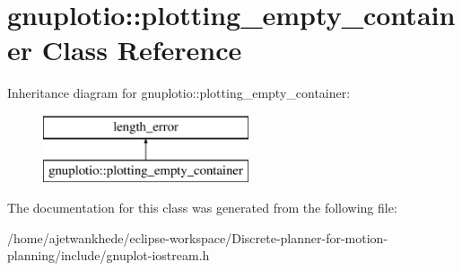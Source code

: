 \hypertarget{classgnuplotio_1_1plotting__empty__container}{}\section{gnuplotio\+:\+:plotting\+\_\+empty\+\_\+container Class Reference}
\label{classgnuplotio_1_1plotting__empty__container}
Inheritance diagram for gnuplotio\+:\+:plotting\+\_\+empty\+\_\+container\+:\begin{figure}[H]
\begin{center}
\leavevmode
\includegraphics[height=2.000000cm]{classgnuplotio_1_1plotting__empty__container}
\end{center}
\end{figure}


The documentation for this class was generated from the following file\+:\begin{DoxyCompactItemize}
\item 
/home/ajetwankhede/eclipse-\/workspace/\+Discrete-\/planner-\/for-\/motion-\/planning/include/gnuplot-\/iostream.\+h\end{DoxyCompactItemize}
